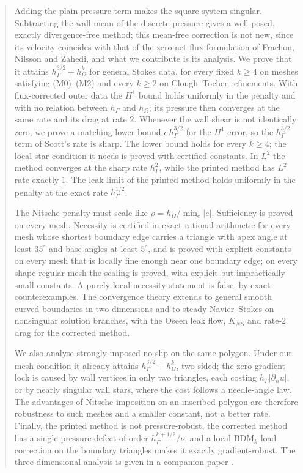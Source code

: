 \documentclass[11pt,reqno]{amsart}
\theoremstyle{plain}
\theoremstyle{definition}
\begin{document}
\begin{abstract}
Adding the plain pressure term makes the square system singular. Subtracting the wall mean of the discrete pressure gives a well-posed, exactly divergence-free method; this mean-free correction is not new, since its velocity coincides with that of the zero-net-flux formulation of Frachon, Nilsson and Zahedi, and what we contribute is its analysis. We prove that it attains $h_\Gamma^{3/2}+h_\Omega^k$ for general Stokes data, for every fixed $k\ge4$ on meshes satisfying (M0)--(M2) and every $k\ge2$ on Clough--Tocher refinements. With flux-corrected outer data the $H^1$ bound holds uniformly in the penalty and with no relation between $h_\Gamma$ and $h_\Omega$; its pressure then converges at the same rate and its drag at rate $2$. Whenever the wall shear is not identically zero, we prove a matching lower bound $c\,h_\Gamma^{3/2}$ for the $H^1$ error, so the $h_\Gamma^{3/2}$ term of Scott's rate is sharp. The lower bound holds for every $k\ge4$; the local star condition it needs is proved with certified constants. In $L^2$ the method converges at the sharp rate $h_\Gamma^2$, while the printed method has $L^2$ rate exactly $1$. The leak limit of the printed method holds uniformly in the penalty at the exact rate $h_\Gamma^{1/2}$.

The Nitsche penalty must scale like $\rho=h_\Omega/\min_e|e|$. Sufficiency is proved on every mesh. Necessity is certified in exact rational arithmetic for every mesh whose shortest boundary edge carries a triangle with apex angle at least $35^\circ$ and base angles at least $5^\circ$, and is proved with explicit constants on every mesh that is locally fine enough near one boundary edge; on every shape-regular mesh the scaling is proved, with explicit but impractically small constants. A purely local necessity statement is false, by exact counterexamples. The convergence theory extends to general smooth curved boundaries in two dimensions and to steady Navier--Stokes on nonsingular solution branches, with the Oseen leak flow, $K_{NS}$ and rate-$2$ drag for the corrected method.

We also analyse strongly imposed no-slip on the same polygon. Under our mesh condition it already attains $h_\Gamma^{3/2}+h_\Omega^k$, two-sided; the zero-gradient lock is caused by wall vertices in only two triangles, each costing $h_\Gamma|\partial_nu|$, or by nearly singular wall stars, where the cost follows a needle-angle law. The advantages of Nitsche imposition on an inscribed polygon are therefore robustness to such meshes and a smaller constant, not a better rate. Finally, the printed method is not pressure-robust, the corrected method has a single pressure defect of order $h_\Gamma^{k+1/2}/\nu$, and a local $\mathrm{BDM}_k$ load correction on the boundary triangles makes it exactly gradient-robust. The three-dimensional analysis is given in a companion paper \cite{PadhiThreeD}.


\end{abstract}
\end{document}
